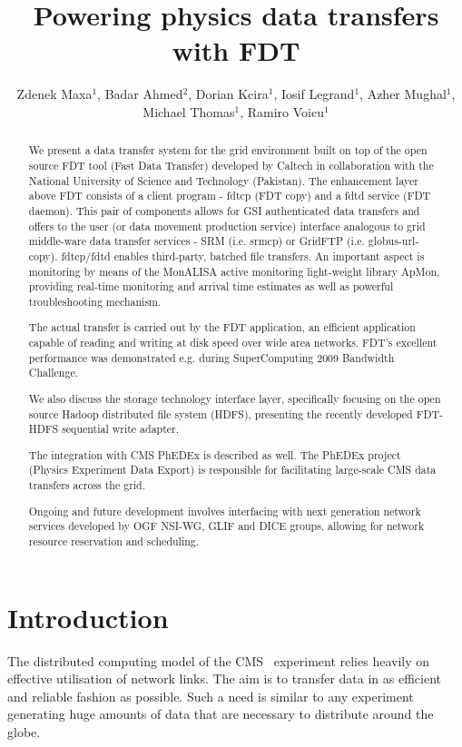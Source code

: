 \documentclass[a4paper]{jpconf}
\begin{document}
\title{Powering physics data transfers with FDT}

\author{Zdenek Maxa$^1$, Badar Ahmed$^2$, Dorian Kcira$^1$,
Iosif Legrand$^1$, Azher Mughal$^1$, Michael Thomas$^1$,
Ramiro Voicu$^1$}


\address{$^1$ California Institute of Technology, Pasadena, California, USA}
\address{$^2$ National University of Science and Technology, Pakistan}



\begin{abstract}
We present a data transfer system for the grid environment built on top of the
open source FDT tool (Fast Data Transfer) developed by Caltech in
collaboration with the National University of Science and Technology
(Pakistan). The enhancement layer above FDT consists of a client program -
fdtcp (FDT copy) and a fdtd service (FDT daemon). This pair of components
allows for GSI authenticated data transfers and offers to the user (or data
movement production service) interface analogous to grid middle-ware data
transfer services - SRM (i.e. srmcp) or GridFTP (i.e. globus-url-copy).
fdtcp/fdtd enables third-party, batched file transfers. An important aspect is
monitoring by means of the MonALISA active monitoring light-weight library
ApMon, providing real-time monitoring and arrival time estimates as well as
powerful troubleshooting mechanism.

The actual transfer is carried out by the FDT application, an efficient
application capable of reading and writing at disk speed over wide area
networks. FDT's excellent performance was demonstrated e.g. during
SuperComputing 2009 Bandwidth Challenge.

We also discuss the storage technology interface layer, specifically focusing
on the open source Hadoop distributed file system (HDFS), presenting the
recently developed FDT-HDFS sequential write adapter.

The integration with CMS PhEDEx is described as well.
The PhEDEx project (Physics Experiment Data Export) is responsible for
facilitating large-scale CMS data transfers across the grid.

Ongoing and future development involves interfacing with next generation
network services developed by OGF NSI-WG, GLIF and DICE groups, allowing for
network resource reservation and scheduling.
\end{abstract}


\section{Introduction} %
The distributed computing model of the CMS~\cite{cms} experiment relies
heavily on effective
utilisation of network links. The aim is to transfer data in
as efficient and reliable fashion as possible. Such a need is similar to
any experiment generating huge amounts of data that are necessary to
distribute around the globe.
\end{document}
